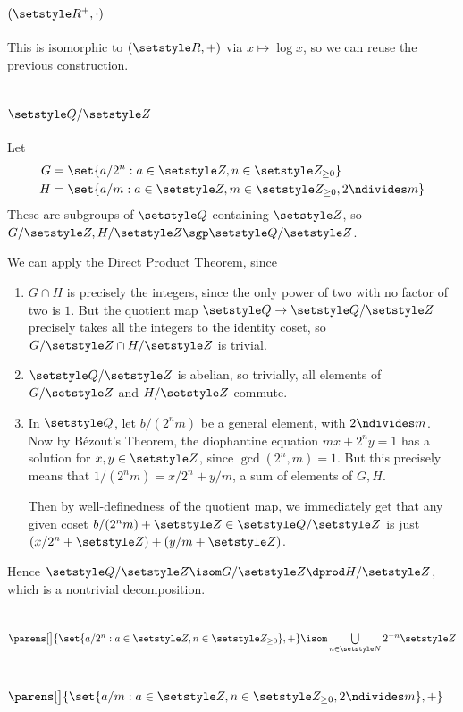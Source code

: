 \documentclass[fleqn,a4paper,11pt]{article}
\begin{document}
\section{\((\R^+, \cdot)\)}

This is isomorphic to \((\R, +)\) via \(x \mapsto \log x\), so we can reuse the
previous construction.

\section{\(\Q / \Z\)}

Let
\begin{align*}
 G &= \set{a/2^n : a \in \Z, n \in \Z_{\ge 0}} \\
 H &= \set{a/m : a \in \Z, m \in \Z_{\ge 0}, 2 \ndivides m}
\end{align*}
These are subgroups of \(\Q\) containing \(\Z\), so
\(G / \Z, H / \Z \sgp \Q / \Z\).

We can apply the Direct Product Theorem, since
\begin{enumerate}[label=(\roman*)]
 \item
  \(G \cap H\) is precisely the integers, since the only power of two with no
  factor of two is \(1\). But the quotient map \(\Q \to \Q/\Z\) precisely takes
  all the integers to the identity coset, so \(G/\Z \cap H/\Z\) is trivial.
 \item
  \(\Q/\Z\) is abelian, so trivially, all elements of \(G/\Z\) and \(H/\Z\)
  commute.
 \item
  In \(\Q\), let \(b/(2^n m)\) be a general element, with \(2 \ndivides m\). Now
  by B\'ezout's Theorem, the diophantine equation  \(mx + 2^n y = 1\) has a
  solution for \(x, y \in \Z\), since \(\gcd(2^n, m) = 1\). But this precisely
  means that \(1/(2^n m) = x/2^n + y/m\), a sum of elements of \(G, H\).

  Then by well-definedness of the quotient map, we immediately get that any
  given coset \(b/(2^n m) + \Z \in \Q / \Z\) is just
  \((x/2^n + \Z) + (y/m + \Z)\).
\end{enumerate}
Hence \(\Q/\Z \isom G/\Z \dprod H/\Z\), which is a nontrivial decomposition.

\section{\(\parens[\big]{\set{a / 2^n : a \in \Z, n \in \Z_{\ge 0}}, +}
           \isom \bigcup\limits_{n \in \N} 2^{-n} \Z \)}

\section{\(\parens[\big]{
            \set{a / m : a \in \Z, n \in \Z_{\ge 0}, 2 \ndivides m}, +}\)}
\end{document}
